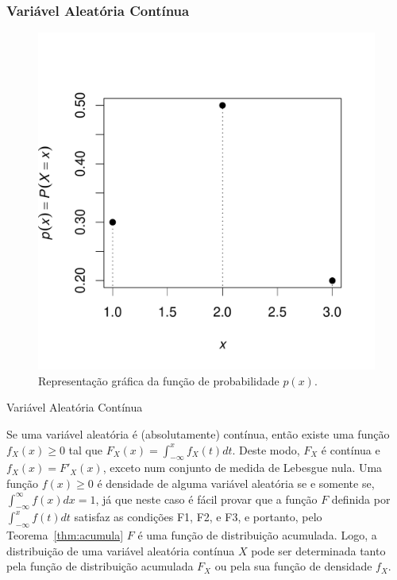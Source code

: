 \begin{frame}
\frametitle{\textbf{Variável Aleatória Contínua}}
	\begin{figure}[!htb]
	\begin{center}
		\vspace{-0.5cm}
		\includegraphics[scale=0.22]{fig12.pdf}
				\vspace{-0.5cm}
		\caption{\label{fig12} Representação gráfica da função de probabilidade $p(x).$}
	\end{center}
\end{figure}
	\vspace{-0.2cm}
\begin{block}{Variável Aleatória Contínua}

Se uma variável aleatória é
(absolutamente) contínua, então existe uma função $f_X(x)\geq 0$ tal
que $F_X(x)=\int_{-\infty}^{x}f_X(t)dt$. Deste modo, $F_X$ é
contínua e $f_X(x)=F'_X(x)$, exceto num conjunto de medida de
Lebesgue nula. Uma função $f(x)\geq 0$ é densidade de alguma
variável aleatória se e somente se,
$\int_{-\infty}^{\infty}f(x)dx=1$, já que neste caso é fácil provar
que a função $F$ definida por $\int_{-\infty}^{x}f(t)dt$ satisfaz as
condições F1, F2, e F3, e portanto, pelo Teorema~\ref{thm:acumula} $F$
é uma função de distribuição acumulada. Logo, a distribuição de uma
variável aleatória contínua $X$ pode ser determinada tanto pela
função de distribuição acumulada $F_X$ ou pela sua função de
densidade $f_X$.

\end{block}
\end{frame}


